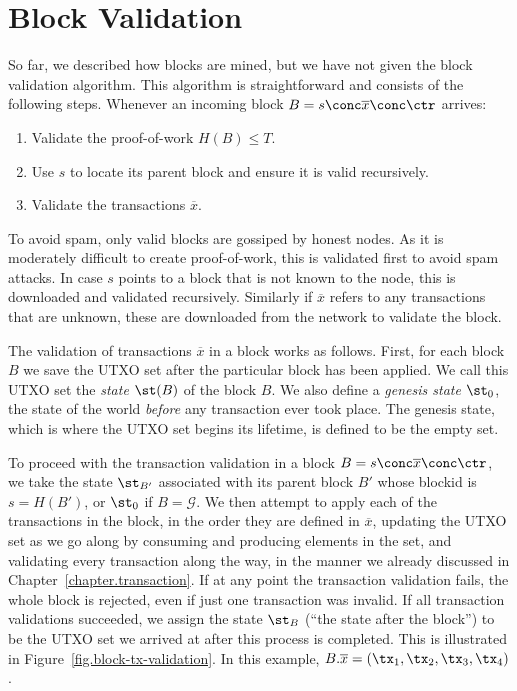\section{Block Validation}

So far, we described how blocks are mined, but we have not given the block validation algorithm.
This algorithm is straightforward and consists of the following steps. Whenever an incoming
block $B = s \conc \overline{x} \conc \ctr$ arrives:

\begin{enumerate}
    \item Validate the proof-of-work $H(B) \leq T$.
    \item Use $s$ to locate its parent block and ensure it is valid recursively.
    \item Validate the transactions $\overline{x}$.
\end{enumerate}

To avoid spam, only valid blocks are gossiped by honest nodes. As it is moderately difficult to
create proof-of-work, this is validated first to avoid spam attacks. In case $s$ points to a block
that is not known to the node, this is downloaded and validated recursively. Similarly if
$\overline{x}$ refers to any transactions that are unknown, these are downloaded from the network
to validate the block.

The validation of transactions
$\overline{x}$ in a block works as follows.
First, for each block $B$ we save the UTXO set after the particular block has been applied.
We call this UTXO set the \emph{state} $\st(B)$ of the block $B$.
We also define a \emph{genesis state} $\st_0$, the state of the world \emph{before}
any transaction ever
took place. The genesis state, which is where the UTXO set begins its lifetime, is defined to be the
empty set.

To proceed with the transaction validation in a block $B = s \conc \overline{x} \conc \ctr$, we take the state
$\st_{B'}$ associated with
its parent block $B'$ whose blockid is $s = H(B')$, or $\st_0$ if $B = \mathcal{G}$.
We then attempt to apply each of the transactions in the block, in the order
they are defined in $\overline{x}$, updating the UTXO set as we go along by consuming
and producing elements in the set, and validating
every transaction along the way, in the manner we already discussed in Chapter~\ref{chapter.transaction}.
If at any point the transaction validation fails, the whole block is rejected,
even if just one transaction was invalid. If all transaction validations succeeded,
we assign the state $\st_B$ (``the state after the block'') to be the UTXO set we arrived at after
this process is completed. This is illustrated in Figure~\ref{fig.block-tx-validation}.
In this example, $B.\overline{x} = (\tx_1, \tx_2, \tx_3, \tx_4)$.

